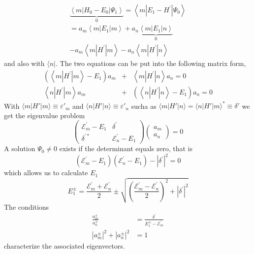 \begin{equation}
\begin{aligned} \underbrace{\left\langle m\left|H_{0}-E_{0}\right| \Psi_{1}\right\rangle}_{0}=\left\langle m\left|E_{1}-H^{\prime}\right| \Psi_{0}\right\rangle \\= a_{m}\left\langle m\left|E_{1}\right| m\right\rangle+ a_{n} \underbrace{\left\langle m\left|E_{1}\right| n\right\rangle}_{0} \\-a_{m}\left\langle m\left|H^{\prime}\right| m\right\rangle- a_{n}\left\langle m\left|H^{\prime}\right| n\right\rangle \end{aligned}
\end{equation}
and also with $\langle n |$. The two equations can be put into the following matrix form,
\begin{equation}
    \begin{array}{ccc}
        \left(\left\langle m\left|H^{\prime}\right| m\right\rangle- E_{1}\right) a_{m}&+&\left\langle m\left|H^{\prime}\right| n\right\rangle a_{n}=0\\
        \left\langle n\left|H^{\prime}\right| m\right\rangle a_{m}&+&\left(\left\langle n\left|H^{\prime}\right| n\right\rangle- E_{1}\right) a_{n}=0
    \end{array}
    \end{equation}
With $\langle m|H'|m\rangle\equiv\varepsilon'_m$ and $\langle n|H'|n\rangle\equiv\varepsilon'_n$ sucha as $\langle m|H'|n\rangle=\langle n|H'|m\rangle^*\equiv\delta'$ we get the eigenvalue problem
\begin{equation}
\left(\begin{array}{cc}{\mathcal{E}_{m}^{\prime}-E_{1}} & {\delta^{\prime}} \\ {\delta^{\prime *}} & {\mathcal{E}_{n}^{\prime}-E_{1}}\end{array}\right)\left(\begin{array}{c}{a_{m}} \\ {a_{n}}\end{array}\right)=0
\end{equation}
A solution $\Psi_0\neq 0$ exists if the determinant equals zero, that is
\begin{equation}
    \left(\mathcal{E}_{m}^{\prime}-E_{1}\right)\left(\mathcal{E}_{n}^{\prime}-E_{1}\right)-\left|\delta^{\prime}\right|^{2}=0
    \end{equation}
which allows us to calculate $E_1$
\begin{equation}
    E_{1}^{\pm}=\frac{\mathcal{E}_{m}^{\prime}+\mathcal{E}_{n}^{\prime}}{2} \pm \sqrt{\left(\frac{\mathcal{E}_{m}^{\prime}-\mathcal{E}_{n}^{\prime}}{2}\right)^{2}+\left|\delta^{\prime}\right|^{2}}
    \end{equation}
The conditions
\begin{equation}
\begin{aligned} \frac{a_{m}^{\pm}}{a_{n}^{\pm}} &=\frac{\delta^{\prime}}{E_{1}^{\pm}-\mathcal{E}_{m}^{\prime}} \\\left|a_{m}^{\pm}\right|^{2}+\left|a_{n}^{\pm}\right|^{2} &=1 \end{aligned}
\end{equation}
characterize the associated eigenvectors.

